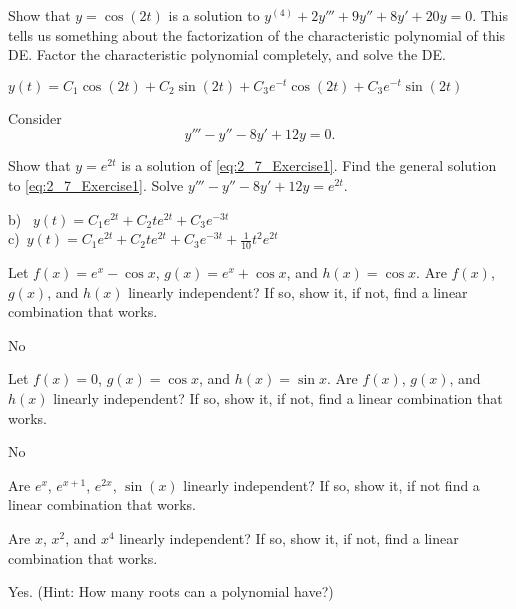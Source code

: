 \begin{exercise}
Show that $y=\cos(2t)$ is a solution to $y^{(4)}+2y'''+9y''+8y'+20y=0$. %
This tells us something about the factorization of the characteristic polynomial of this DE. Factor the characteristic polynomial completely, and solve the DE.
\end{exercise}
\comboSol{%
}
{%
$y(t) = C_1\cos(2t) + C_2\sin(2t) + C_3e^{-t}\cos(2t) + C_3e^{-t}\sin(2t)$
}

\begin{exercise}
Consider 
\begin{equation}
y'''-y''-8y'+12y=0. \label{eq:2_7_Exercise1}
\end{equation}
\begin{tasks}
\task Show that $y=e^{2t}$ is a solution of \eqref{eq:2_7_Exercise1}.
\task Find the general solution to \eqref{eq:2_7_Exercise1}.
\task Solve $y'''-y''-8y'+12y=e^{2t}$.
\end{tasks}
\end{exercise}
\comboSol{%
}
{%
b)~ $y(t) = C_1e^{2t} + C_2te^{2t} + C_3e^{-3t}$ \\
c)~$y(t) = C_1e^{2t} + C_2te^{2t} + C_3e^{-3t} + \frac{1}{10}t^2e^{2t}$
}

\begin{exercise}
Let
$f(x) = e^x - \cos x$, $g(x) = e^x + \cos x$, and $h(x) = \cos x$.
Are $f(x)$, $g(x)$, and $h(x)$
linearly independent?  If so, show
it, if not, find a linear combination that works.
\end{exercise}
\comboSol{%
}
{%
No
}

\begin{exercise}
Let
$f(x) = 0$, $g(x) = \cos x$, and $h(x) = \sin x$.
Are $f(x)$, $g(x)$, and $h(x)$
linearly independent?  If so, show
it, if not, find a linear combination that works.
\end{exercise}
\comboSol{%
}
{%
No
}

\begin{exercise}\ansMark%
Are $e^{x}$, $e^{x+1}$, $e^{2x}$, $\sin(x)$ linearly independent?
If so, show it, if not find a linear combination that works.
\end{exercise}

\begin{exercise}
Are $x$, $x^2$, and $x^4$
linearly independent?  If so, show
it, if not, find a linear combination that works.
\end{exercise}
\comboSol{%
}
{%
Yes. (Hint: How many roots can a polynomial have?)
}

